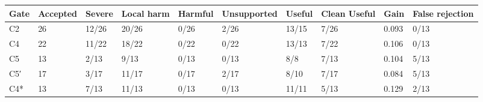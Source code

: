 \begin{tabular}{llllllllll}
\toprule
Gate & Accepted & Severe & Local harm & Harmful & Unsupported & Useful & Clean Useful & Gain & False rejection \\
\midrule
C2 & 26 & 12/26 & 20/26 & 0/26 & 2/26 & 13/15 & 7/26 & 0.093 & 0/13 \\
C4 & 22 & 11/22 & 18/22 & 0/22 & 0/22 & 13/13 & 7/22 & 0.106 & 0/13 \\
C5 & 13 & 2/13 & 9/13 & 0/13 & 0/13 & 8/8 & 7/13 & 0.104 & 5/13 \\
C5′ & 17 & 3/17 & 11/17 & 0/17 & 2/17 & 8/10 & 7/17 & 0.084 & 5/13 \\
C4* & 13 & 7/13 & 11/13 & 0/13 & 0/13 & 11/11 & 5/13 & 0.129 & 2/13 \\
\bottomrule
\end{tabular}
